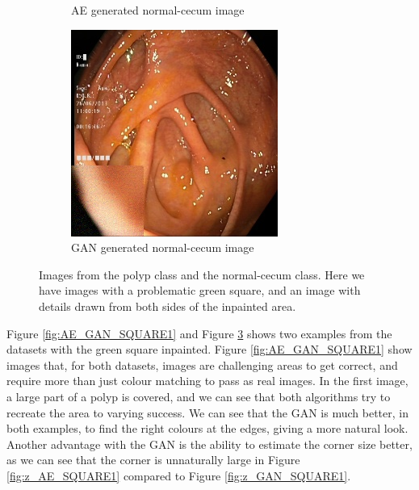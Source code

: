 \begin{figure}[h]
\begin{subfigure}[t]{\myfigsizethree}
            \caption{AE generated normal-cecum image}   
            \label{fig:nc_AE_SQUARE2}
        \end{subfigure}
        \qquad%
        \begin{subfigure}[t]{\myfigsizethree}   
            \centering 
            \includegraphics[width=\textwidth]{experiments/figures/greensquare/ncGAN.jpg}
            \caption{GAN generated normal-cecum image}  
            \label{fig:nc_GAN_SQUARE2}
        \end{subfigure}
        \caption{Images from the polyp class and the normal-cecum class. Here we have images with a problematic green square, and an image with details drawn from both sides of the inpainted area.} 
        \label{fig:AE_GAN_SQUARE2}
\end{figure}
    
Figure \ref{fig:AE_GAN_SQUARE1} and Figure \ref{fig:AE_GAN_SQUARE2} shows two examples from the datasets with the green square inpainted.
Figure \ref{fig:AE_GAN_SQUARE1} show images that, for both datasets, images are challenging areas to get correct, and require more than just colour matching to pass as real images. In the first image, a large part of a polyp is covered, and we can see that both algorithms try to recreate the area to varying success. We can see that the GAN is much better, in both examples, to find the right colours at the edges, giving a more natural look.
Another advantage with the GAN is the ability to estimate the corner size better, as we can see that the corner is unnaturally large in Figure \ref{fig:z_AE_SQUARE1} compared to Figure \ref{fig:z_GAN_SQUARE1}.
 
